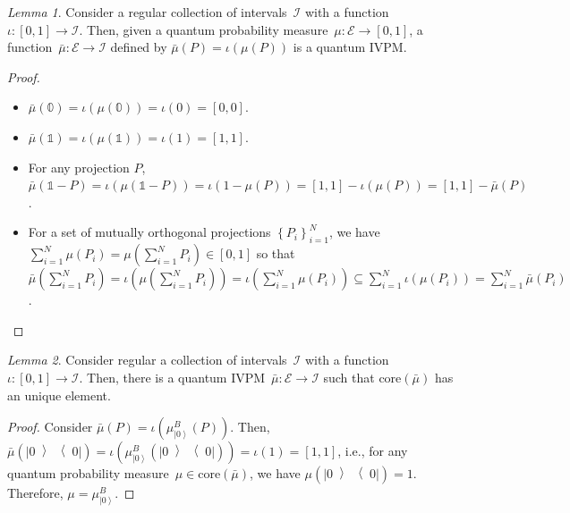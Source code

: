 \documentclass{article}
\theoremstyle{remark}
\newtheorem{lemma}{Lemma}
\newcommand{\events}{\ensuremath{\mathcal{E}}}
\newcommand{\ket}[1]{{\left\vert{#1}\right\rangle}}
\newcommand{\op}[2]{\ensuremath{\left\vert{#1}\middle\rangle\middle\langle{#2}\right\vert}}
\newcommand{\proj}[1]{\op{#1}{#1}}
\begin{document}
\begin{lemma}Consider a regular collection of intervals~$\mathscr{I}$
with a function~$\iota:\left[0,1\right]\rightarrow\mathscr{I}$.
Then, given a quantum probability measure~$\mu:\events\rightarrow\left[0,1\right]$,
a function~$\bar{\mu}:\events\rightarrow\mathscr{I}$ defined by
$\bar{\mu}(P)=\iota\left(\mu(P)\right)$ is a quantum IVPM.\end{lemma}
\begin{proof}
~
\begin{itemize}
\item $\bar{\mu}(\mathbb{0})=\iota\left(\mu(\mathbb{0})\right)=\iota\left(0\right)=\left[0,0\right]$.
\item $\bar{\mu}(\mathbb{1})=\iota\left(\mu(\mathbb{1})\right)=\iota\left(1\right)=\left[1,1\right]$. 
\item For any projection $P$, $\bar{\mu}\left(\mathbb{1}-P\right)=\iota\left(\mu(\mathbb{1}-P)\right)=\iota\left(1-\mu(P)\right)=\left[1,1\right]-\iota\left(\mu(P)\right)=\left[1,1\right]-\bar{\mu}\left(P\right)$. 
\item For a set of mutually orthogonal projections $\left\{ P_{i}\right\} _{i=1}^{N}$,
we have $\sum_{i=1}^{N}\mu\left(P_{i}\right)=\mu\left(\sum_{i=1}^{N}P_{i}\right)\in\left[0,1\right]$
so that $\bar{\mu}\left(\sum_{i=1}^{N}P_{i}\right)=\iota\left(\mu\left(\sum_{i=1}^{N}P_{i}\right)\right)=\iota\left(\sum_{i=1}^{N}\mu\left(P_{i}\right)\right)\subseteq\sum_{i=1}^{N}\iota\left(\mu\left(P_{i}\right)\right)=\sum_{i=1}^{N}\bar{\mu}\left(P_{i}\right)$. 
\end{itemize}
\end{proof}
\begin{lemma}Consider regular a collection of intervals~$\mathscr{I}$
with a function~$\iota:\left[0,1\right]\rightarrow\mathscr{I}$.
Then, there is a quantum IVPM~$\bar{\mu}:\events\rightarrow\mathscr{I}$
such that $\mathrm{core}\left(\bar{\mu}\right)$ has an unique element.\end{lemma}
\begin{proof}
Consider $\bar{\mu}(P)=\iota\left(\mu_{\ket{0}}^{B}(P)\right)$. Then,
$\bar{\mu}\left(\proj{0}\right)=\iota\left(\mu_{\ket{0}}^{B}\left(\proj{0}\right)\right)=\iota\left(1\right)=\left[1,1\right]$,
i.e., for any quantum probability measure~$\mu\in\mathrm{core}\left(\bar{\mu}\right)$,
we have $\mu\left(\proj{0}\right)=1$. Therefore, $\mu=\mu_{\ket{0}}^{B}$.
\end{proof}
\end{document}
